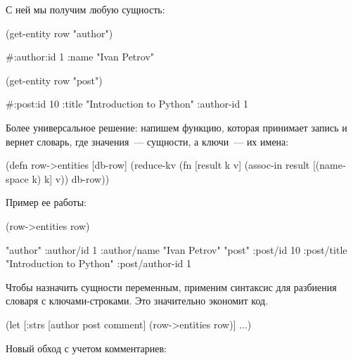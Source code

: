 С ней мы получим любую сущность:

\begin{english}
  \begin{clojure}
(get-entity row "author")

#:author{:id 1 :name "Ivan Petrov"}

(get-entity row "post")

#:post{:id 10
       :title "Introduction to Python"
       :author-id 1}
  \end{clojure}
\end{english}

Более универсальное решение: напишем функцию, которая принимает запись и вернет словарь, где значения~--- сущности, а ключи~--- их имена:

\pagebreaklarge

\begin{english}
  \begin{clojure}
(defn row->entities
  [db-row]
  (reduce-kv
   (fn [result k v]
     (assoc-in result [(namespace k) k] v))
   {}
   db-row))
  \end{clojure}
\end{english}

Пример ее работы:

\begin{english}
  \begin{clojure}
(row->entities row)

{"author"
 {:author/id 1
  :author/name "Ivan Petrov"}
 "post"
 {:post/id 10
  :post/title "Introduction to Python"
  :post/author-id 1}}
  \end{clojure}
\end{english}

Чтобы назначить сущности переменным, применим синтаксис  для разбиения словаря с ключами-строками. Это значительно экономит код.

\begin{english}
  \begin{clojure}
(let [{:strs [author
              post
              comment]}
      (row->entities row)]
  ...)
  \end{clojure}
\end{english}

Новый обход с учетом комментариев:


